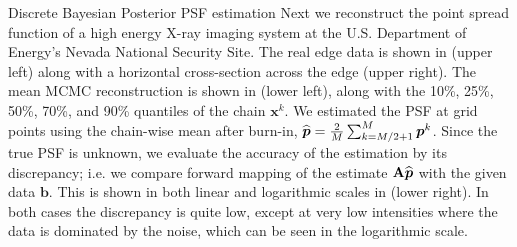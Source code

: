 \begin{chapter}{Discrete Bayesian Posterior PSF estimation}
Next we reconstruct the point spread function of a high energy X-ray imaging system at the U.S. Department of Energy's Nevada National Security Site. The real edge data is shown in  (upper left) along with a horizontal cross-section across the edge (upper right). The mean MCMC reconstruction is shown in  (lower left), along with the 10\%, 25\%, 50\%, 70\%, and 90\% quantiles of the chain $\bm{x}^{k}$.
We estimated the PSF at grid points using the chain-wise mean after burn-in, $\widehat {\mbox{\boldmath$p$}} = \frac 2M \sum_{k=M/2+1}^M {\mbox{\boldmath$p$}}^{k}$.
Since the true PSF is unknown, we evaluate the accuracy of the estimation by its discrepancy; i.e. we compare forward mapping of the estimate ${\bf A} {\widehat{\mbox{\boldmath$p$}}}$ with the given data $\bm b$.  This is shown in both linear and logarithmic scales in  (lower right). 
In both cases the discrepancy is quite low, except at very low intensities where the data is dominated by the noise, which can be seen in the logarithmic scale.


\end{chapter}
